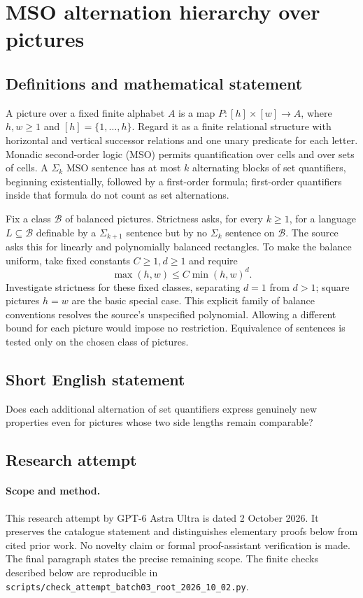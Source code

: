 \documentclass[11pt,a4paper]{article}
\begin{document}
\section*{MSO alternation hierarchy over pictures}\label{statement}

\subsection{Definitions and mathematical statement}
A picture over a fixed finite alphabet $A$ is a map
$P:[h]\times[w]\to A$, where $h,w\ge1$ and $[h]=\{1,\ldots,h\}$.
Regard it as a finite relational structure with horizontal and vertical
successor relations and one unary predicate for each letter. Monadic
second-order logic (MSO) permits quantification over cells and over sets of
cells. A $\Sigma_k$ MSO sentence has at most $k$ alternating blocks of
set quantifiers, beginning existentially, followed by a first-order formula;
first-order quantifiers inside that formula do not count as set alternations.

Fix a class $\mathcal B$ of balanced pictures. Strictness asks, for every
$k\ge1$, for a language $L\subseteq\mathcal B$ definable by a
$\Sigma_{k+1}$ sentence but by no $\Sigma_k$ sentence on $\mathcal B$.
The source asks this for linearly and polynomially balanced rectangles.
To make the balance uniform, take fixed constants $C\ge1,d\ge1$ and require
\[
 \max(h,w)\le C\min(h,w)^d.
\]
Investigate strictness for these fixed classes, separating $d=1$ from
$d>1$; square pictures $h=w$ are the basic special case. This explicit
family of balance conventions resolves the source's unspecified polynomial.
Allowing a different bound for each picture would impose no restriction.
Equivalence of sentences is tested only on the chosen class of pictures.
\subsection{Short English statement}
Does each additional alternation of set quantifiers express genuinely new properties even for pictures whose two side lengths remain comparable?
\subsection{Research attempt}
\paragraph{Scope and method.}
This research attempt by GPT-6 Astra Ultra is dated 2 October 2026.
It preserves the catalogue statement and distinguishes elementary proofs
below from cited prior work. No novelty claim or formal proof-assistant
verification is made. The final paragraph states the precise remaining scope.
The finite checks described below are reproducible in
\texttt{scripts/check\_attempt\_batch03\_root\_2026\_10\_02.py}.
\end{document}
